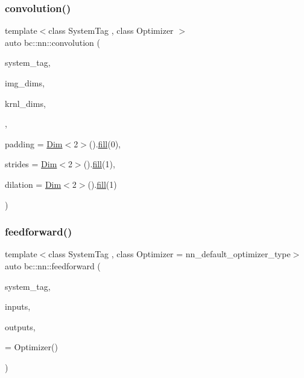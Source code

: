 \subsubsection{\texorpdfstring{convolution()}{convolution()}\hspace{0.1cm}{\footnotesize\ttfamily [2/2]}}
{\footnotesize\ttfamily template$<$class System\+Tag , class Optimizer $>$ \\
auto bc\+::nn\+::convolution (\begin{DoxyParamCaption}\item[{System\+Tag}]{system\+\_\+tag,  }\item[{\hyperlink{structbc_1_1Dim}{Dim}$<$ 3 $>$}]{img\+\_\+dims,  }\item[{\hyperlink{structbc_1_1Dim}{Dim}$<$ 3 $>$}]{krnl\+\_\+dims,  }\item[{Optimizer}]{,  }\item[{\hyperlink{structbc_1_1Dim}{Dim}$<$ 2 $>$}]{padding = {\ttfamily \hyperlink{structbc_1_1Dim}{Dim}$<$2$>$().\hyperlink{tensor__iteralgos_8h_afd10a40f252abd24d1faa2752becdd53}{fill}(0)},  }\item[{\hyperlink{structbc_1_1Dim}{Dim}$<$ 2 $>$}]{strides = {\ttfamily \hyperlink{structbc_1_1Dim}{Dim}$<$2$>$().\hyperlink{tensor__iteralgos_8h_afd10a40f252abd24d1faa2752becdd53}{fill}(1)},  }\item[{\hyperlink{structbc_1_1Dim}{Dim}$<$ 2 $>$}]{dilation = {\ttfamily \hyperlink{structbc_1_1Dim}{Dim}$<$2$>$().\hyperlink{tensor__iteralgos_8h_afd10a40f252abd24d1faa2752becdd53}{fill}(1)} }\end{DoxyParamCaption})}

\mbox{\label{namespacebc_1_1nn_a2aa178844eb976dd07e0254e5047b897}} 
\subsubsection{\texorpdfstring{feedforward()}{feedforward()}\hspace{0.1cm}{\footnotesize\ttfamily [1/2]}}
{\footnotesize\ttfamily template$<$class System\+Tag , class Optimizer  = nn\+\_\+default\+\_\+optimizer\+\_\+type$>$ \\
auto bc\+::nn\+::feedforward (\begin{DoxyParamCaption}\item[{System\+Tag}]{system\+\_\+tag,  }\item[{int}]{inputs,  }\item[{int}]{outputs,  }\item[{Optimizer}]{ = {\ttfamily Optimizer()} }\end{DoxyParamCaption})}

